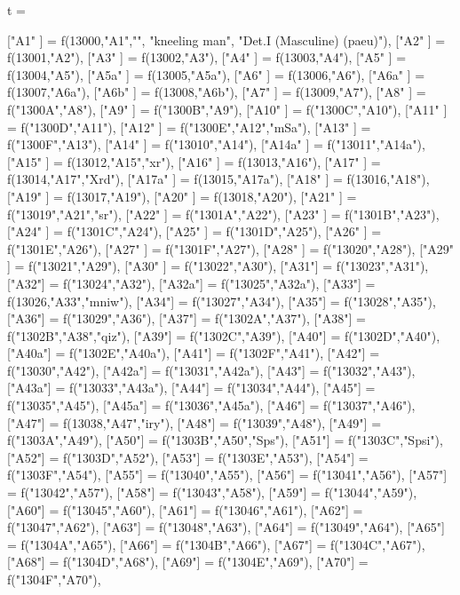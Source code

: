 \documentclass{article}
\begin{document}
\begin{luacode*}
t ={
   ["A1"    ]       =   f(13000,"A1","",
                         "kneeling man",
                          "Det.I (Masculine) (paeu)"),
   ["A2"    ] 		=  f(13001,"A2"),
   ["A3"    ] 		=  f(13002,"A3"),
   ["A4"    ] 		=  f(13003,"A4"),
   ["A5"    ]		=  f(13004,"A5"), 
   ["A5a"   ] 		=  f(13005,"A5a"),
   ["A6"    ]		=  f(13006,"A6"),
   ["A6a"   ]		=  f(13007,"A6a"),
   ["A6b"   ]		=  f(13008,"A6b"),
   ["A7"    ] 		=  f(13009,"A7"),
   ["A8"    ] 		=  f("1300A","A8"),
   ["A9"    ] 		=  f("1300B","A9"),
   ["A10"   ] 		=  f("1300C","A10"),
   ["A11"   ] 		=  f("1300D","A11"),
   ["A12"   ] 		=  f("1300E","A12","mSa"),
   ["A13"   ] 		=  f("1300F","A13"),
   ["A14"   ] 		=  f("13010","A14"),
   ["A14a"  ] 		=  f("13011","A14a"),
   ["A15"   ]		=  f(13012,"A15","xr"),
   ["A16"   ] 		=  f(13013,"A16"),
   ["A17"   ] 		=  f(13014,"A17","Xrd"),
   ["A17a"  ] 		=  f(13015,"A17a"),
   ["A18"   ] 		=  f(13016,"A18"),
   ["A19"   ] 		=  f(13017,"A19"),
   ["A20"   ] 		=  f(13018,"A20"),
   ["A21"   ] 		=  f("13019","A21","sr"),
   ["A22"   ] 		=  f("1301A","A22"),
   ["A23"   ] 		=  f("1301B","A23"),
   ["A24"   ] 		=  f("1301C","A24"),
   ["A25"   ] 		=  f("1301D","A25"),
   ["A26"   ] 		=  f("1301E","A26"),
   ["A27"   ] 		=  f("1301F","A27"),
   ["A28"   ] 		=  f("13020","A28"),
   ["A29"   ] 		=  f("13021","A29"),
   ["A30"   ] 		=  f("13022","A30"),
  	["A31"] 		= f("13023","A31"),
  	["A32"] 		= f("13024","A32"),
 	["A32a"] 		= f("13025","A32a"),
  	["A33"] 		= f(13026,"A33","mniw"),
	["A34"] 		= f("13027","A34"),
	["A35"] 		= f("13028","A35"),
	["A36"] 		= f("13029","A36"),
	["A37"] 		= f("1302A","A37"),
	["A38"] 		= f("1302B","A38","qiz"),
	["A39"] 		= f("1302C","A39"),
	["A40"] 		= f("1302D","A40"),
	["A40a"] 		= f("1302E","A40a"),
	["A41"] 		= f("1302F","A41"),
	["A42"] 		= f("13030","A42"),
	["A42a"] 		= f("13031","A42a"),
	["A43"] 		= f("13032","A43"),
	["A43a"] 		= f("13033","A43a"),
	["A44"] 		= f("13034","A44"),
	["A45"] 		= f("13035","A45"),
	["A45a"] 		= f("13036","A45a"),
	["A46"] 		= f("13037","A46"),
  	["A47"] 		= f(13038,"A47","iry"),
	["A48"] 		= f("13039","A48"),
	["A49"] 		= f("1303A","A49"),
  	["A50"] 		= f("1303B","A50","Sps"),
  	["A51"] 		= f("1303C","Spsi"),
	["A52"] 		= f("1303D","A52"),
	["A53"] 		= f("1303E","A53"),
	["A54"] 		= f("1303F","A54"),
	["A55"] 		= f("13040","A55"),
	["A56"] 		= f("13041","A56"),
	["A57"] 		= f("13042","A57"),
	["A58"] 		= f("13043","A58"),
	["A59"] 		= f("13044","A59"),
	["A60"] 		= f("13045","A60"),
	["A61"] 		= f("13046","A61"),
	["A62"] 		= f("13047","A62"),
	["A63"] 		= f("13048","A63"),
	["A64"] 		= f("13049","A64"),
	["A65"] 		= f("1304A","A65"),
	["A66"] 		= f("1304B","A66"),
	["A67"] 		= f("1304C","A67"),
	["A68"] 		= f("1304D","A68"),
	["A69"] 		= f("1304E","A69"),
	["A70"] 		= f("1304F","A70"),

}
\end{luacode*}
\end{document}

